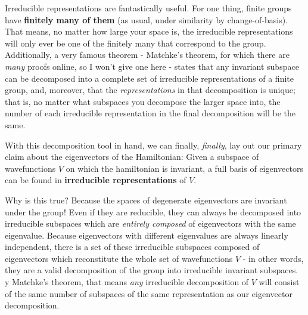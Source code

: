 \documentclass{article}
\begin{document}
Irreducible representations are fantastically useful. For one thing, finite groups have \textbf{finitely many of them} (as usual, under similarity by change-of-basis). That means, no matter how large your space is, the irreducible representations will only ever be one of the finitely many that correspond to the group. Additionally, a very famous theorem - Matchke's theorem, for which there are \textit{many} proofs online, so I won't give one here - states that any invariant subspace can be decomposed into a complete set of irreducible representations of a finite group, and, moreover, that the \textit{representations} in that decomposition is unique; that is, no matter what subspaces you decompose the larger space into, the number of each irreducible representation in the final decomposition will be the same.

With this decomposition tool in hand, we can finally, \textit{finally}, lay out our primary claim about the eigenvectors of the Hamiltonian: Given a subspace of wavefunctions $V$ on which the hamiltonian is invariant, a full basis of eigenvectors can be found in \textbf{irreducible representations} of $V$.

Why is this true? Because the spaces of degenerate eigenvectors are invariant under the group! Even if they are reducible\footnotemark, they can always be decomposed into irreducible subspaces which are \textit{entirely composed} of eigenvectors with the same eigenvalue. Because eigenvectors with different eigenvalues are always linearly independent, there is a set of these irreducible subspaces composed of eigenvectors which reconstitute the whole set of wavefunctions $V$ - in other words, they are a valid decomposition of the group into irreducible invariant subspaces. y Matchke's theorem, that means \textit{any} irreducible decomposition of $V$ will consist of the same number of subspaces of the same representation as our eigenvector decomposition.
\end{document}
